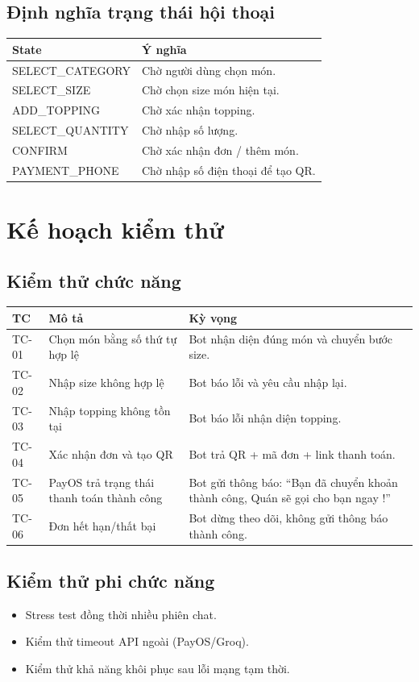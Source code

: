 \documentclass[12pt,a4paper]{article}
\begin{document}
\subsection{Định nghĩa trạng thái hội thoại}
\begin{longtable}{p{3.5cm}p{7.5cm}}
\toprule
\textbf{State} & \textbf{Ý nghĩa} \\
\midrule
SELECT\_CATEGORY & Chờ người dùng chọn món. \\
SELECT\_SIZE & Chờ chọn size món hiện tại. \\
ADD\_TOPPING & Chờ xác nhận topping. \\
SELECT\_QUANTITY & Chờ nhập số lượng. \\
CONFIRM & Chờ xác nhận đơn / thêm món. \\
PAYMENT\_PHONE & Chờ nhập số điện thoại để tạo QR. \\
\bottomrule
\end{longtable}

\section{Kế hoạch kiểm thử}
\subsection{Kiểm thử chức năng}
\begin{longtable}{p{1.7cm}p{8.8cm}p{2.3cm}}
\toprule
\textbf{TC} & \textbf{Mô tả} & \textbf{Kỳ vọng} \\
\midrule
TC-01 & Chọn món bằng số thứ tự hợp lệ & Bot nhận diện đúng món và chuyển bước size. \\
TC-02 & Nhập size không hợp lệ & Bot báo lỗi và yêu cầu nhập lại. \\
TC-03 & Nhập topping không tồn tại & Bot báo lỗi nhận diện topping. \\
TC-04 & Xác nhận đơn và tạo QR & Bot trả QR + mã đơn + link thanh toán. \\
TC-05 & PayOS trả trạng thái thanh toán thành công & Bot gửi thông báo: ``Bạn đã chuyển khoản thành công, Quán sẽ gọi cho bạn ngay !'' \\
TC-06 & Đơn hết hạn/thất bại & Bot dừng theo dõi, không gửi thông báo thành công. \\
\bottomrule
\end{longtable}

\subsection{Kiểm thử phi chức năng}
\begin{itemize}
    \item Stress test đồng thời nhiều phiên chat.
    \item Kiểm thử timeout API ngoài (PayOS/Groq).
    \item Kiểm thử khả năng khôi phục sau lỗi mạng tạm thời.
\end{itemize}
\end{document}
